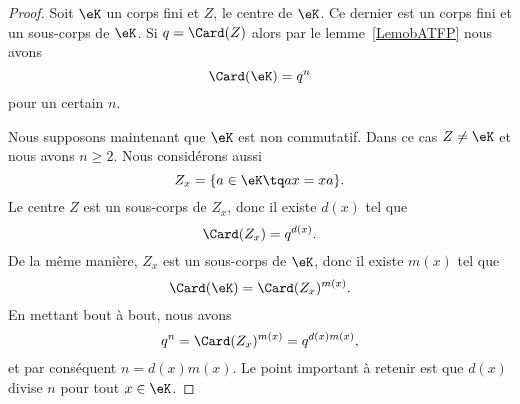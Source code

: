 \begin{proof}
	Soit \( \eK\) un corps fini et \( Z\), le centre de \( \eK\). Ce dernier est un corps fini et un sous-corps de \( \eK\). Si \( q=\Card(Z)\) alors par le lemme~\ref{LemobATFP} nous avons
	\begin{equation}
		\Card(\eK)=q^n
	\end{equation}
	pour un certain \( n\).

	Nous supposons maintenant que \( \eK\) est non commutatif. Dans ce cas \( Z\neq \eK\) et nous avons \( n\geq 2\). Nous considérons aussi
	\begin{equation}
		Z_x=\{ a\in \eK\tq ax=xa \}.
	\end{equation}
	Le centre \( Z\) est un sous-corps de \( Z_x\), donc il existe \( d(x)\) tel que
	\begin{equation}
		\Card(Z_x)=q^{d(x)}.
	\end{equation}
	De la même manière, \( Z_x\) est un sous-corps de \( \eK\), donc il existe \( m(x)\) tel que
	\begin{equation}
		\Card(\eK)=\Card(Z_x)^{m(x)}.
	\end{equation}
	En mettant bout à bout, nous avons
	\begin{equation}
		q^n=\Card(Z_x)^{m(x)}=q^{d(x)m(x)},
	\end{equation}
	et par conséquent \( n=d(x)m(x)\). Le point important à retenir est que \( d(x)\) divise \( n\) pour tout \( x\in \eK\).


\end{proof}

